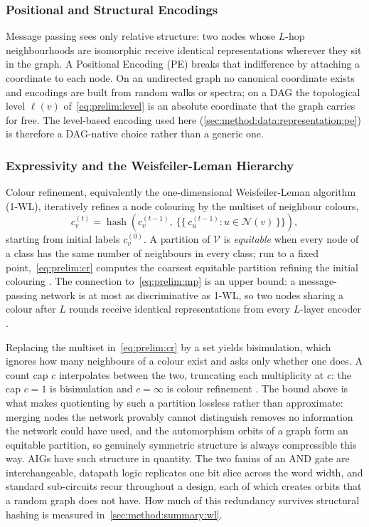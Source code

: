 \subsubsection{Positional and Structural Encodings}
\label{sec:prelim:gnn:pe}
Message passing sees only relative structure: two nodes whose $L$-hop neighbourhoods are
isomorphic receive identical representations wherever they sit in the graph. A Positional
Encoding (PE) breaks that indifference by attaching a coordinate to each node. On an
undirected graph no canonical coordinate exists and encodings are built from random walks
or spectra; on a DAG the topological level $\ell(v)$ of~\eqref{eq:prelim:level} is an
absolute coordinate that the graph carries for free. The level-based encoding used here
(\ref{sec:method:data:representation:pe}) is therefore a DAG-native choice rather than a
generic one.

\subsubsection{Expressivity and the Weisfeiler-Leman Hierarchy}
\label{sec:prelim:gnn:expressivity}
Colour refinement, equivalently the one-dimensional Weisfeiler-Leman algorithm (1-WL),
iteratively refines a node colouring by the multiset of neighbour colours,
\begin{equation}
    c_v^{(t)} = \operatorname{hash}\!\left( c_v^{(t-1)},\
        \bigl\{\!\!\bigl\{\, c_u^{(t-1)} : u \in \mathcal{N}(v) \,\bigr\}\!\!\bigr\}
    \right),
    \label{eq:prelim:cr}
\end{equation}
starting from initial labels $c_v^{(0)}$. A partition of $\mathcal{V}$ is
\emph{equitable} when every node of a class has the same number of neighbours in every
class; run to a fixed point,~\eqref{eq:prelim:cr} computes the coarsest equitable
partition refining the initial colouring \citep{grohe2014colourrefinement}. The
connection to~\eqref{eq:prelim:mp} is an upper bound: a message-passing network is at
most as discriminative as 1-WL, so two nodes sharing a colour after $L$ rounds receive
identical representations from every $L$-layer encoder \citep{xu2019gin}.

Replacing the multiset in~\eqref{eq:prelim:cr} by a set yields bisimulation, which ignores
how many neighbours of a colour exist and asks only whether one does. A count cap $c$
interpolates between the two, truncating each multiplicity at $c$: the cap $c = 1$ is
bisimulation and $c = \infty$ is colour refinement \citep{bollen2023exact}. The bound
above is what makes quotienting by such a partition lossless rather than approximate:
merging nodes the network provably cannot distinguish removes no information the network
could have used, and the automorphism orbits of a graph form an equitable partition, so
genuinely symmetric structure is always compressible this way. AIGs have such structure
in quantity. The two fanins of an AND gate are interchangeable, datapath logic replicates
one bit slice across the word width, and standard sub-circuits recur throughout a design,
each of which creates orbits that a random graph does not have. How much of this
redundancy survives structural hashing is measured in~\ref{sec:method:summary:wl}.

